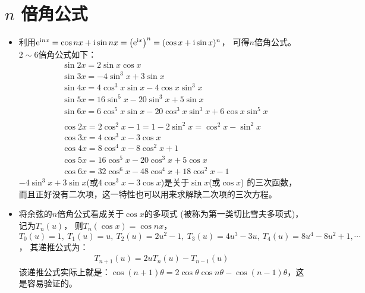 \section{$ n $ 倍角公式}
\begin{itemize}[leftmargin=\inteval{\myitemleftmargin}pt,itemsep=
   \inteval{\myitemitempsep}pt,topsep=\inteval{\myitemtopsep}pt]
\item 利用$ \mathrm{e}^{\mathrm{i} nx}=\cos nx +\mathrm{i}\sin nx=\left(
\mathrm{e}^{\mathrm{i} x} \right)^n =(\cos x+\mathrm{i}\sin x)^n $，
可得$ n $倍角公式。 $ 2\sim 6 $倍角公式如下：
\begin{align*}
    & \sin 2x=2\sin x\cos x \\    
    & \sin 3x=-4 \sin^3 x+ 3\sin x 	  \\
    & \sin 4x=4\cos^3x\sin x-4\cos x\sin^3 x  \\
    & \sin 5x=16\sin^5 x-20\sin^3 x+5 \sin x  \\
    & \sin 6x=6\cos^5 x\sin x-20\cos^3 x\sin^3 x+6\cos x \sin^5 x \\
    \\
    & \cos 2x=2\cos^2 x-1=1-2\sin^2 x=\cos^2 x- \sin^2 x  \\		
    & \cos 3x=4 \cos^3 x- 3\cos x  \\		
    & \cos 4x=8 \cos^4 x- 8\cos^2 x+1  \\		
    & \cos 5x=16\cos^5 x- 20\cos^3 x+5\cos x  \\
    & \cos 6x=32\cos^6 x-48\cos^4 x+ 18\cos^2 x-1 
\end{align*}
$ -4 \sin^3 x+ 3\sin x $(或$ 4 \cos^3 x- 3\cos x $)是关于$ \sin x $(或$ \cos x $)
的三次函数，而且正好没有二次项，这一特性也可以用来求解缺二次项的三次方程。

\item 将余弦的$ n $倍角公式看成关于$ \cos x $的多项式
(被称为第一类切比雪夫多项式)，记为$ T_n(u) $，
则$ T_n(\cos x)=\cos nx $，
$ T_0(u)=1,\ T_1(u)=u,\ T_2(u)=2u^2-1,\ T_3(u)=4u^3-3u,\ T_4(u)=8u^4-8u^2+1,\cdots $，
其递推公式为：
\begin{align}\label{车比雪夫多项式递推关系}
    T_{n+1}(u)=2uT_n(u)-T_{n-1}(u)
\end{align}
该递推公式实际上就是：$ \cos(n+1)\theta=2\cos\theta\cos n\theta-
\cos(n-1)\theta $，这是容易验证的。 

%


\end{itemize}
